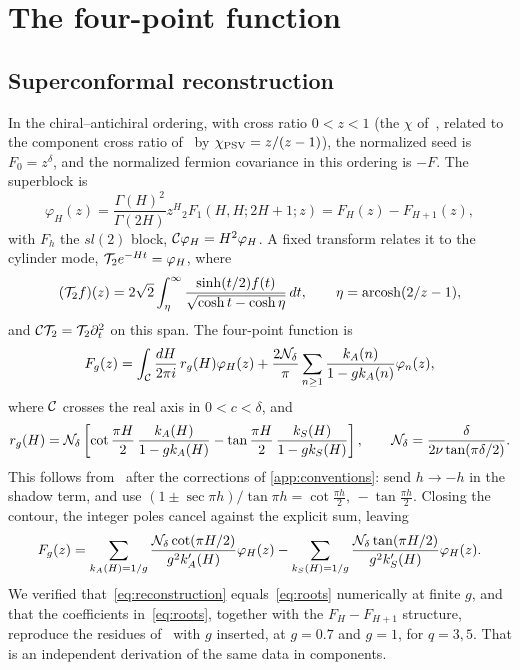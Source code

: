 \section{The four-point function}
\label{sec:fourpoint}

\subsection{Superconformal reconstruction}

In the chiral--antichiral ordering, with cross ratio $0<z<1$ (the $\chi$ of~\cite{Bulycheva:2018qcp}, related to the component cross ratio of~\cite{Peng:2017spg} by $\chi_{\rm PSV}=z/(z-1)$), the normalized seed is $F_0=z^\delta$, and the normalized fermion covariance in this ordering is $-F$. The superblock is~\cite{Bulycheva:2018qcp}
\begin{equation}\label{eq:block}
\varphi_H(z)=\frac{\Gamma(H)^2}{\Gamma(2H)}z^H{}_2F_1(H,H;2H+1;z)=F_H(z)-F_{H+1}(z),
\end{equation}
with $F_h$ the $sl(2)$ block, $\mathcal{C}\varphi_H=H^2\varphi_H$. A fixed transform relates it to the cylinder mode, $\mathcal{T}_2e^{-Ht}=\varphi_H$, where
\begin{equation}\label{eq:T2}
(\mathcal{T}_2f)(z)=2\sqrt2\int_\eta^\infty\frac{\sinh(t/2)f(t)}{\sqrt{\cosh t-\cosh\eta}}\,dt,\qquad\eta=\operatorname{arcosh}(2/z-1),
\end{equation}
and $\mathcal{C}\mathcal{T}_2=\mathcal{T}_2\partial_t^2$ on this span. The four-point function is
\begin{equation}\label{eq:reconstruction}
F_g(z)=\int_{\mathcal{C}}\frac{dH}{2\pi i}\,r_g(H)\varphi_H(z)+\frac{2\mathcal{N}_\delta}{\pi}\sum_{n\ge1}\frac{k_A(n)}{1-gk_A(n)}\varphi_n(z),
\end{equation}
where $\mathcal{C}$ crosses the real axis in $0<c<\delta$, and
\begin{equation}\label{eq:rg}
r_g(H)=\mathcal{N}_\delta\left[\cot\frac{\pi H}{2}\,\frac{k_A(H)}{1-gk_A(H)}-\tan\frac{\pi H}{2}\,\frac{k_S(H)}{1-gk_S(H)}\right],\qquad\mathcal{N}_\delta=\frac{\delta}{2\nu\tan(\pi\delta/2)}.
\end{equation}
This follows from~\cite[(4.106)]{Bulycheva:2018qcp} after the corrections of \cref{app:conventions}: send $h\to-h$ in the shadow term, and use $(1\pm\sec\pi h)/\tan\pi h=\cot\frac{\pi h}{2},\,-\tan\frac{\pi h}{2}$. Closing the contour, the integer poles cancel against the explicit sum, leaving
\begin{equation}\label{eq:roots}
F_g(z)=\sum_{k_A(H)=1/g}\frac{\mathcal{N}_\delta\cot(\pi H/2)}{g^2k_A'(H)}\varphi_H(z)-\sum_{k_S(H)=1/g}\frac{\mathcal{N}_\delta\tan(\pi H/2)}{g^2k_S'(H)}\varphi_H(z).
\end{equation}
We verified that~\eqref{eq:reconstruction} equals~\eqref{eq:roots} numerically at finite $g$, and that the coefficients in~\eqref{eq:roots}, together with the $F_H-F_{H+1}$ structure, reproduce the residues of~\cite[(4.26)]{Peng:2017spg} with $g$ inserted, at $g=0.7$ and $g=1$, for $q=3,5$. That is an independent derivation of the same data in components.

